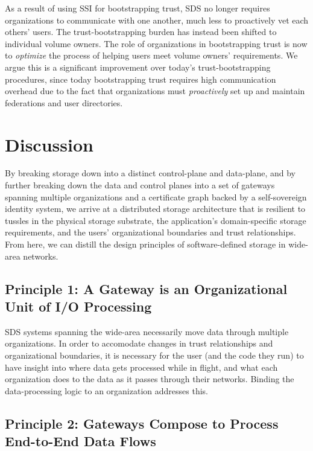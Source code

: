 As a result of using SSI for bootstrapping trust, SDS no longer requires
organizations to communicate with one another, much less to proactively vet each
others' users.  The trust-bootstrapping burden has instead been shifted to individual volume owners.
The role of organizations in bootstrapping trust is now to \emph{optimize} the
process of helping users meet volume owners' requirements.  We argue this is a
significant improvement over today's trust-bootstrapping procedures, since today
bootstrapping trust requires high communication overhead due to the fact that
organizations must \emph{proactively} set up and maintain federations and user
directories.

\section{Discussion}


By breaking storage down into a distinct control-plane and data-plane, and by
further breaking down the data and control planes into a set of gateways spanning multiple
organizations and a certificate graph backed by a self-sovereign identity system,
we arrive at a distributed storage architecture that is resilient
to tussles in the physical storage substrate, the application's
domain-specific storage requirements, and the users' organizational boundaries
and trust relationships.  From here, we can distill the design principles of
software-defined storage in wide-area networks.

\subsection{Principle 1: A Gateway is an Organizational Unit of I/O Processing}

SDS systems spanning the wide-area necessarily move data through multiple
organizations.  In order to accomodate changes in trust relationships
and organizational boundaries, it is necessary for the user (and the code they
run) to have insight into where data gets processed while in flight, and what
each organization does to the data as it passes through their networks.  Binding
the data-processing logic to an organization addresses this.

\subsection{Principle 2: Gateways Compose to Process End-to-End Data Flows}

